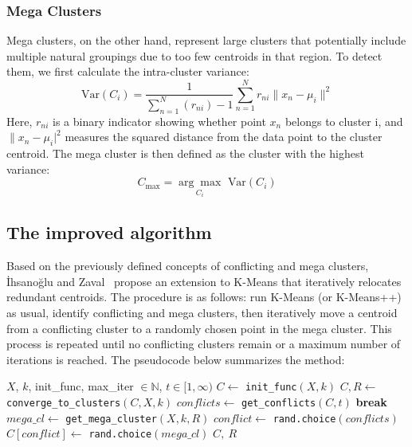 \documentclass[10pt,twocolumn,letterpaper]{article}
\begin{document}
\subsubsection{Mega Clusters}

Mega clusters, on the other hand, represent large clusters that potentially
include multiple natural groupings due to too few centroids in that region. To
detect them, we first calculate the intra-cluster variance:
\begin{equation}
    \label{eq:cluster-var}
    \text{Var}(C_i) = \frac{1}{\sum_{n=1}^{N} (r_{ni}) - 1} \sum_{n=1}^{N} r_{ni} \|x_n - \mu_i\|^2
\end{equation}
Here, $r_{ni}$ is a binary indicator showing whether point $x_n$ belongs to
cluster i, and $\|x_n - \mu_i|^2$ measures the squared distance from the data
point to the cluster centroid. The mega cluster is then defined as the cluster
with the highest variance:
\begin{equation}
    \label{eq:mega-cluster}
    C_{\max} = \underset{C_i}{\arg\max}\text{ Var}(C_i)
\end{equation}


\subsection{The improved algorithm}\label{subsec:the-improved-algorithm}

Based on the previously defined concepts of conflicting and mega clusters,
İhsanoğlu and Zaval~\cite{Abdullah10601123} propose an extension to K-Means
that iteratively relocates redundant centroids. The procedure is as follows:
run K-Means (or K-Means++) as usual, identify conflicting and mega clusters,
then iteratively move a centroid from a conflicting cluster to a randomly
chosen point in the mega cluster. This process is repeated until no conflicting
clusters remain or a maximum number of iterations is reached. The pseudocode
below summarizes the method:

\begin{algorithmic}[1]
    \label{alg:imprv-kmeans}
    \Require $X$, $k$, init\_func, max\_iter $ \in \mathbb{N}$, $t \in [1, \infty)$
    \State $C \gets$ \texttt{init\_func}$(X, k)$
    \State
    \State $C,R \gets$ \texttt{converge\_to\_clusters}$(C, X, k)$
    \State
    \State $conflicts \gets$ \texttt{get\_conflicts}$(C, t)$
    \State
    \State \textbf{break}
    \EndIf
    \State
    \State $mega\_cl \gets$ \texttt{get\_mega\_cluster}$(X, k, R)$
    \State
    \State $conflict \gets$ \texttt{rand.choice}$(conflicts)$
    \State $C[conflict] \gets$ \texttt{rand.choice}$(mega\_cl)$
    \EndFor
    \State \Return $C,~R$
\end{algorithmic}
\end{document}
